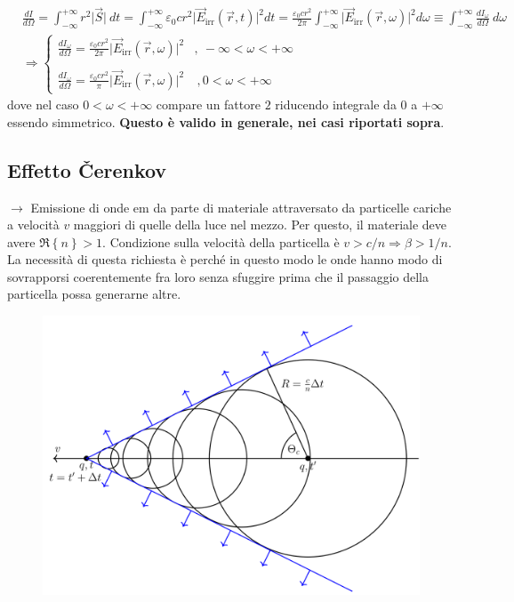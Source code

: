 \documentclass[10pt, a4paper]{scrartcl}
\numberwithin{equation}{subsection}
\theoremstyle{style1}
\begin{document}
\begin{equation}
	\begin{split}
		&\frac{d I}{d \Omega } = \int_{-\infty} ^{+\infty} r^2 \lvert \vec{S} \rvert \ dt = \int_{-\infty} ^{+\infty} \varepsilon _0 cr^2 \lvert \vec{E}_\text{irr}(\vec{r},t) \rvert ^2 dt = \frac{\varepsilon _0 cr^2}{2\pi} \int_{-\infty} ^{+\infty} \lvert \vec{E}_\text{irr}(\vec{r},\omega) \rvert ^2 d\omega \equiv \int_{-\infty} ^{+\infty} \frac{d I_\omega}{d \Omega } \ d\omega\\
		&\Rightarrow \begin{cases}
			\displaystyle \frac{d I_\omega}{d \Omega } = \frac{\varepsilon _0 cr^2}{2\pi} \lvert \vec{E}_\text{irr}(\vec{r},\omega) \rvert ^2 & ,\ -\infty<\omega <+\infty\\
			\\
			\displaystyle \frac{d I_\omega}{d \Omega }  = \frac{\varepsilon _0 cr^2}{\pi} \lvert \vec{E}_\text{irr}(\vec{r},\omega) \rvert ^2& \ , 0<\omega < +\infty	
		\end{cases}
	\end{split}
\end{equation}
dove nel caso $0 < \omega<+\infty$ compare un fattore $2$ riducendo integrale da $0$ a $+\infty$ essendo simmetrico. \textbf{Questo \`e valido in generale, nei casi riportati sopra}.
\subsection{Effetto \v Cerenkov}
$\to $ Emissione di onde em da parte di materiale attraversato da particelle cariche a velocit\`a $v$ maggiori di quelle della luce nel mezzo. Per questo, il materiale deve avere $\Re\left\{ n \right\} > 1$. Condizione sulla velocit\`a della particella \`e $v > c / n\Rightarrow  \beta  > 1 / n$. La necessit\`a di questa richiesta \`e perch\'e in questo modo le onde hanno modo di sovrapporsi coerentemente fra loro senza sfuggire prima che il passaggio della particella possa generarne altre.
\begin{figure}[h!]
	\centering
	\includegraphics[width=.5\columnwidth]{c1.png}
\end{figure}
\end{document}
